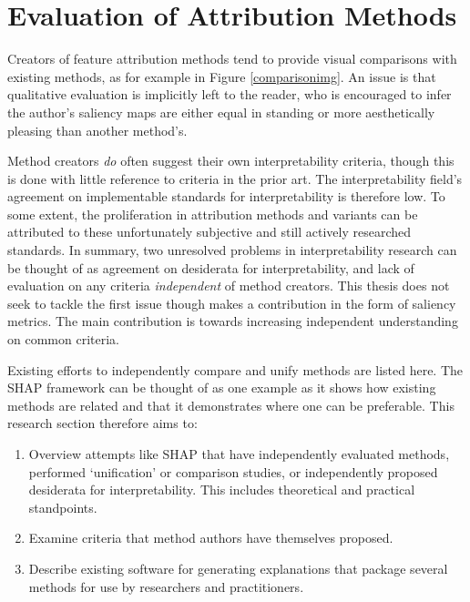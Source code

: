 \documentclass[main]{subfiles}
\begin{document}
\section{Evaluation of Attribution Methods}

Creators of feature attribution methods tend to provide visual comparisons with existing methods, as for example in Figure \ref{comparisonimg}. An issue is that qualitative evaluation is implicitly left to the reader, who is encouraged to infer the author's saliency maps are either equal in standing or more aesthetically pleasing than another method's.

Method creators \textit{do} often suggest their own interpretability criteria, though this is done with little reference to criteria in the prior art. The interpretability field's agreement on implementable standards for interpretability is therefore low. To some extent, the proliferation in attribution methods and variants can be attributed to these unfortunately subjective and still actively researched standards. In summary, two unresolved problems in interpretability research can be thought of as agreement on desiderata for interpretability, and lack of evaluation on any criteria \textit{independent} of method creators. This thesis does not seek to tackle the first issue though makes a contribution in the form of saliency metrics. The main contribution is towards increasing independent understanding on common criteria.

Existing efforts to independently compare and unify methods are listed here. The SHAP framework can be thought of as one example as it shows how existing methods are related and that it demonstrates where one can be preferable. This research section therefore aims to:

\begin{enumerate}

\item Overview attempts like SHAP that have independently evaluated methods, performed `unification' or comparison studies, or independently proposed desiderata for interpretability. This includes theoretical and practical standpoints.
\item Examine criteria that method authors have themselves proposed.
\item Describe existing software for generating explanations that package several methods for use by researchers and practitioners.

\end{enumerate}
\end{document}

